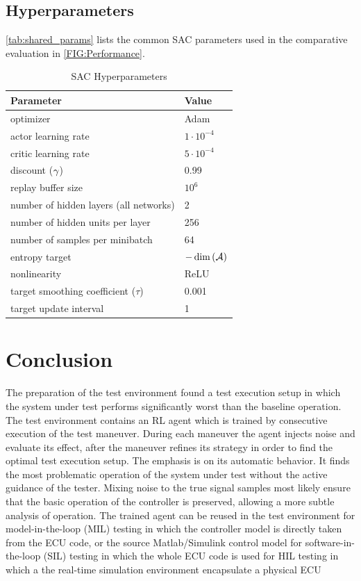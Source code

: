 \documentclass[a4paper, fleqn]{template/cas-dc}
\begin{document}
	\subsection{Hyperparameters}
	
	\autoref{tab:shared_params} lists the common SAC parameters used in the comparative evaluation in \autoref{FIG:Performance}.
	
	\begin{table}[H]
		\renewcommand{\arraystretch}{1.1}
		\centering
		\caption{SAC Hyperparameters}
		\label{tab:shared_params}
		\vspace{1mm}
		\begin{tabular}{l| l }
			\toprule
			Parameter &  Value\\
			\midrule
			optimizer &Adam\\
			actor learning rate & $1 \cdot 10^{-4}$\\
			critic learning rate & $5 \cdot 10^{-4}$\\
			discount ($\gamma$) &  0.99\\
			replay buffer size & $10^6$\\
			number of hidden layers (all networks) & 2\\
			number of hidden units per layer & 256\\
			number of samples per minibatch & 64\\
			entropy target & $-\dim\left(\mathcal{A}\right)$ \\
			nonlinearity & ReLU\\
			target smoothing coefficient ($\tau$)& 0.001\\
			target update interval & 1\\			
			\bottomrule
		\end{tabular}
	\end{table}
	
	\section{Conclusion}
	The preparation of the test environment found a test execution setup in which the system under test performs significantly worst than the baseline operation. The test environment contains an RL agent which is trained by consecutive execution of the test maneuver. During each maneuver the agent injects noise and evaluate its effect, after the maneuver refines its strategy in order to find the optimal test execution setup.
	The emphasis is on its automatic behavior. It finds the most problematic operation of the system under test without the active guidance of the tester. Mixing noise to the true signal samples most likely ensure that the basic operation of the controller is preserved, allowing a more subtle analysis of operation.
	The trained agent can be reused in the test environment for model-in-the-loop (MIL) testing in which the controller model is directly taken from the ECU code, or the source Matlab/Simulink control model for software-in-the-loop (SIL) testing in which the whole ECU code is used for HIL testing in which a the real-time simulation environment encapsulate a physical ECU

		
	
				
	
	\listoftodos		
\end{document}
